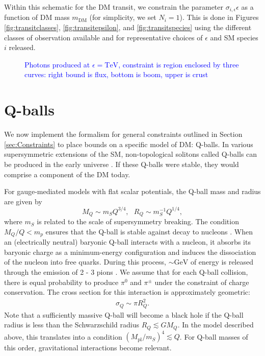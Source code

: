 \documentclass[twocolumn,showpacs,preprintnumbers,amsmath,amssymb,prd]{revtex4}
\begin{document}
Within this schematic for the DM transit, we constrain the parameter $\sigma_{i,\epsilon} \epsilon$ as a function of DM mass $m_\text{DM}$ (for simplicity, we set $N_i = 1$).
This is done in Figures \ref{fig:transitclasses}, \ref{fig:transitepsilon}, and \ref{fig:transitspecies} using the different classes of observation available and for representative choices of $\epsilon$ and SM species $i$ released.


\begin{figure}
\caption{\textcolor{blue}{Photons produced at $\epsilon = \text{TeV}$, constraint is region enclosed by three curves: right bound is flux, bottom is boom, upper is crust}}
\label{fig:}
\end{figure}

\section{Q-balls}
\label{sec:ConcreteExamples}

We now implement the formalism for general constraints outlined in Section \ref{sec:Constraints} to place bounds on a specific model of DM: Q-balls.
In various supersymmetric extensions of the SM, non-topological solitons called Q-balls can be produced in the early universe \cite{Coleman:1985ki, Kusenko:1997si}.
If these Q-balls were stable, they would comprise a component of the DM today.

For gauge-mediated models with flat scalar potentials, the Q-ball mass and radius are given by
\begin{equation}
\label{eq:Qballprop}
M_Q \sim m_S Q^{3/4}, ~~~ R_Q \sim m_S^{-1} Q^{1/4},
\end{equation}
where $m_S$ is related to the scale of supersymmetry breaking.
The condition $M_Q/Q < m_p$ ensures that the Q-ball is stable against decay to nucleons \cite{Dine:2003ax}.
When an (electrically neutral) baryonic Q-ball interacts with a nucleon, it absorbs its baryonic charge as a minimum-energy configuration and induces the dissociation of the nucleon into free quarks.
During this process, $\sim \text{GeV}$ of energy is released through the emission of 2 - 3 pions \cite{Dine:2003ax}.
We assume that for each Q-ball collision, there is equal probability to produce $\pi^0$ and $\pi^\pm$ under the constraint of charge conservation.
The cross section for this interaction is approximately geometric:
\begin{align}
\sigma_Q \sim \pi R_Q^2.
\end{align}
Note that a sufficiently massive Q-ball will become a black hole if the Q-ball radius is less than the Schwarzschild radius $R_Q \lesssim G M_Q$.
In the model described above, this translates into a condition $(M_\text{pl}/m_S)^4 \lesssim Q$.
For Q-ball masses of this order, gravitational interactions become relevant.
\end{document}
